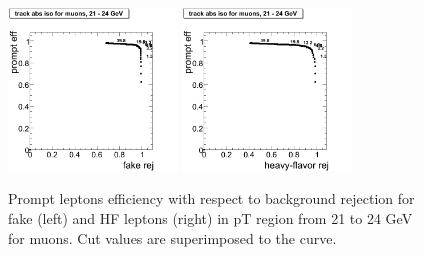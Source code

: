 \begin{figure}[htbp]
\begin{center}

 \includegraphics[width = 0.4\textwidth]{pictures/bkgdRej_sigEff/onlyTrack_muon_fake_ptCut6_ptCut7.png}
\includegraphics[width = 0.4\textwidth]{pictures/bkgdRej_sigEff/onlyTrack_muon_nonPrompt_ptCut6_ptCut7.png}
\caption{\small{Prompt leptons efficiency with respect to background 
rejection for fake (left) and HF leptons (right) in pT region
from 21 to 24 GeV for muons. 
Cut values are superimposed to the curve.}\label{fig:rej_mu7}}
\end{center}
\end{figure}

